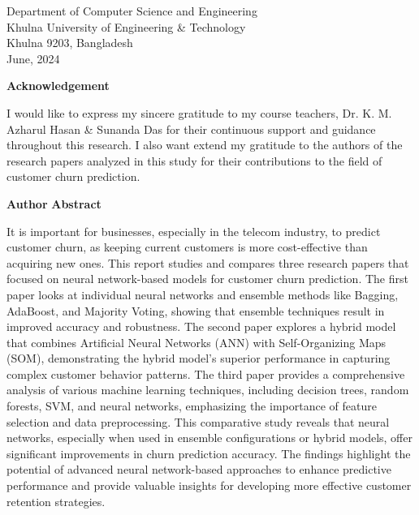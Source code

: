 \begin{titlepage}
\begin{center}
    {\fontsize{12}{1.5}\selectfont Department of Computer Science and Engineering}\\
    \vspace{12pt}
    {\fontsize{12}{1.5}\selectfont Khulna University of Engineering \& Technology}\\
    \vspace{12pt}
    {\fontsize{12}{1.5}\selectfont Khulna 9203, Bangladesh}\\
    \vspace{12pt}
    {\fontsize{12}{1.5}\selectfont June, 2024}\\
    \clearpage

    {\fontsize{16}{1.5}\selectfont \textbf{Acknowledgement}}\\
    \vspace{12pt}
    \vspace{12pt}
    \begin{flushleft}
        \justifying 
        I would like to express my sincere gratitude to my course teachers, Dr. K. M. Azharul Hasan \& Sunanda Das for their continuous support and guidance throughout this research. I also want extend my gratitude to the authors of the research papers analyzed in this study for their contributions to the field of customer churn prediction.
    \end{flushleft}
    {\fontsize{12}{1.5}\selectfont \hfill \textbf{Author}}
    \clearpage
    {\fontsize{16}{1.5}\selectfont \textbf{Abstract}}\\
    \vspace{12pt}
    \vspace{12pt}
    \begin{flushleft}
        \justifying It is important for businesses, especially in the telecom industry, to predict customer churn, as keeping current customers is more cost-effective than acquiring new ones. This report studies and compares three research papers that focused on neural network-based models for customer churn prediction. The first paper looks at individual neural networks and ensemble methods like Bagging, AdaBoost, and Majority Voting, showing that ensemble techniques result in improved accuracy and robustness. The second paper explores a hybrid model that combines Artificial Neural Networks (ANN) with Self-Organizing Maps (SOM), demonstrating the hybrid model's superior performance in capturing complex customer behavior patterns. The third paper provides a comprehensive analysis of various machine learning techniques, including decision trees, random forests, SVM, and neural networks, emphasizing the importance of feature selection and data preprocessing. This comparative study reveals that neural networks, especially when used in ensemble configurations or hybrid models, offer significant improvements in churn prediction accuracy. The findings highlight the potential of advanced neural network-based approaches to enhance predictive performance and provide valuable insights for developing more effective customer retention strategies.
    \end{flushleft}
    

\end{center}
\end{titlepage}
